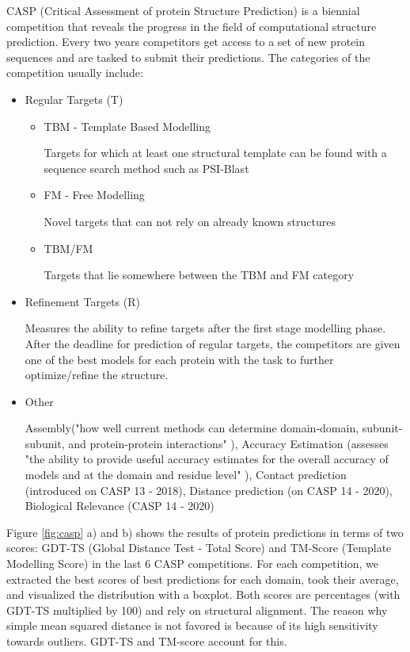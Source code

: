 CASP (Critical Assessment of protein Structure Prediction) is a biennial competition that reveals the progress in the field of computational structure prediction. 
Every two years competitors get access to a set of new protein sequences and are tasked to submit their predictions. 
The categories of the competition usually include:
\begin{itemize}
    \item Regular Targets (T)
    
    \begin{itemize}
        \item TBM - Template Based Modelling
        
        Targets for which at least one structural template can be found with a sequence search method such as PSI-Blast
        \item FM - Free Modelling
        
        Novel targets that can not rely on already known structures
        \item TBM/FM
        
        Targets that lie somewhere between the TBM and FM category
    \end{itemize}
    
    \item Refinement Targets (R)
    
        Measures the ability to refine targets after the first stage modelling phase. After the deadline for prediction of regular targets, the competitors are given one of the best models for each protein with the task to further optimize/refine the structure.
        
    \item Other
    
    Assembly("how well current methods can determine domain-domain, subunit-subunit, and protein-protein interactions" \cite{casp}), Accuracy Estimation (assesses "the ability to provide useful accuracy estimates for the overall accuracy of models and at the domain and residue level" \cite{casp}), Contact prediction (introduced on CASP 13 - 2018), Distance prediction (on CASP 14 - 2020), Biological Relevance (CASP 14 - 2020) \cite{casp, casp13}
\end{itemize}

Figure \ref{fig:casp} a) and b) shows the results of protein predictions in terms of two scores: GDT-TS (Global Distance Test - Total Score) and TM-Score (Template Modelling Score) in the last 6 CASP competitions. 
For each competition, we extracted the best scores of best predictions for each domain, took their average, and visualized the distribution with a boxplot.
Both scores are percentages (with GDT-TS multiplied by 100) and rely on structural alignment. 
The reason why simple mean squared distance is not favored is because of its high sensitivity towards outliers. 
GDT-TS and TM-score account for this. 


